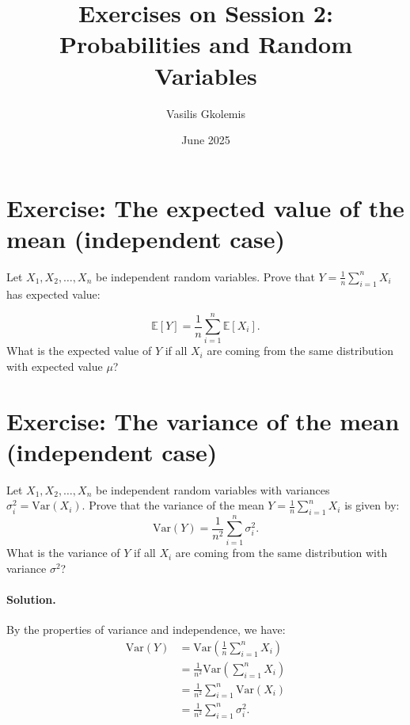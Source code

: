 \documentclass[11pt]{article}
\title{Exercises on Session 2: Probabilities and Random Variables}
\author{Vasilis Gkolemis}
\date{June 2025}
\newif\ifshowanswers
\begin{document}
\maketitle

\section{Exercise: The expected value of the mean (independent case)}
Let \(X_1, X_2, \ldots, X_n\) be independent random variables. Prove that $Y = \frac{1}{n} \sum_{i=1}^n X_i$ has expected value:

\[
  \mathbb{E}[Y] = \frac{1}{n} \sum_{i=1}^n \mathbb{E}[X_i].
\]
What is the expected value of \(Y\) if all \(X_i\) are coming from the same distribution with expected value \(\mu\)?

\ifshowanswers
  \paragraph{Solution.}

\begin{align*}
  \mathbb{E}[Y] &= \mathbb{E}\left[\frac{1}{n} \sum_{i=1}^n X_i\right] \\
                &= \frac{1}{n} \mathbb{E}\left[\sum_{i=1}^n X_i\right] \\
                &= \frac{1}{n} \sum_{i=1}^n \mathbb{E}[X_i].
\end{align*}

If all \(X_i\) are coming from the same distribution with expected value \(\mu\), then:
\[
  \mathbb{E}[Y] = \frac{1}{n} \sum_{i=1}^n \mu = \mu.
\]

\fi


\section{Exercise: The variance of the mean (independent case)}
Let \(X_1, X_2, \ldots, X_n\) be independent random variables with variances \(\sigma_i^2 = \text{Var}(X_i)\). Prove that the variance of the mean \(Y = \frac{1}{n} \sum_{i=1}^n X_i\) is given by:
\[
  \text{Var}(Y) = \frac{1}{n^2} \sum_{i=1}^n \sigma_i^2.
\]
What is the variance of \(Y\) if all \(X_i\) are coming from the same distribution with variance \(\sigma^2\)?

\ifshowanswers
\paragraph{Solution.}
By the properties of variance and independence, we have:
\begin{align*}
  \text{Var}(Y) &= \text{Var}\left(\frac{1}{n} \sum_{i=1}^n X_i\right) \\
                &= \frac{1}{n^2} \text{Var}\left(\sum_{i=1}^n X_i\right) \\
                &= \frac{1}{n^2} \sum_{i=1}^n \text{Var}(X_i) \\
                &= \frac{1}{n^2} \sum_{i=1}^n \sigma_i^2.
\end{align*}
\end{document}
